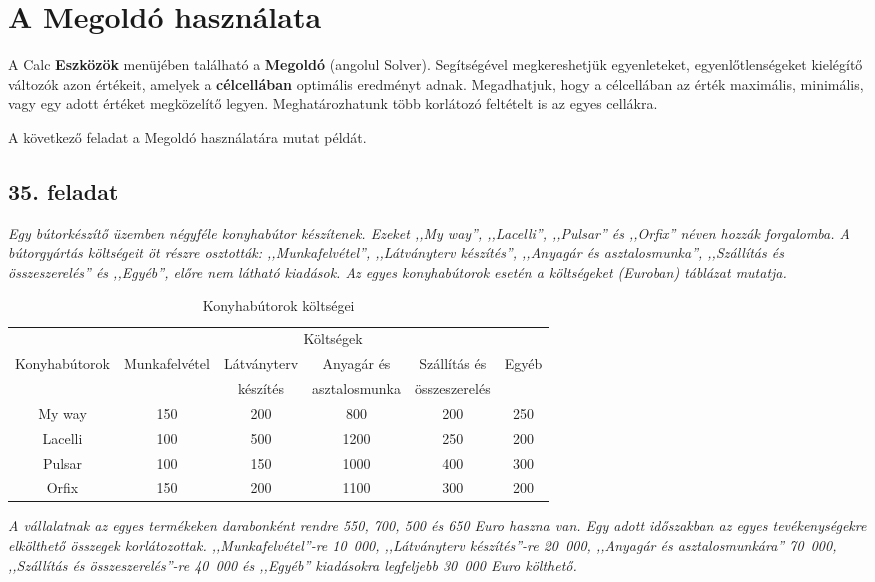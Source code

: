 \chapter{A Megoldó használata}
\thispagestyle{empty}

A Calc \textbf{Eszközök} menüjében található a
\textbf{Megoldó} (angolul Solver). Segítségével megkereshetjük egyenleteket, 
egyenlőtlenségeket kielégítő változók azon értékeit,
amelyek a \textbf{célcellában} optimális eredményt adnak. 
Megadhatjuk, hogy a célcellában az érték maximális, minimális, 
vagy egy adott értéket megközelítő legyen. Meghatározhatunk több
korlátozó feltételt is az egyes cellákra.

A következő feladat a Megoldó használatára mutat példát.


\section{35. feladat}

{\itshape
Egy bútorkészítő üzemben
négyféle konyhabútor készítenek. Ezeket ,,My way'', ,,Lacelli'',
,,Pulsar'' és ,,Orfix'' néven hozzák forgalomba. A
bútorgyártás költségeit öt részre osztották: ,,Munkafelvétel'',
,,Látványterv készítés'', ,,Anyagár és asztalosmunka'',
,,Szállítás és összeszerelés'' és ,,Egyéb'', előre nem látható
kiadások. Az egyes konyhabútorok esetén a költségeket
(Euroban)  táblázat mutatja.}

\begin{table}[!h]
\begin{center}
\caption{Konyhabútorok költségei}\label{Költségek}
\begin{tabular}{|c|c|c|c|c|c|}
\hline
 & \multicolumn{5}{c|}{Költségek}\\ \cline{2-6}
Konyhabútorok & Munkafelvétel & Látványterv & Anyagár és &
Szállítás és & Egyéb\\ 
 & & készítés & asztalosmunka & összeszerelés & \\ \hline
My way & 150 & 200 & 800 & 200 & 250\\ \hline
Lacelli & 100 & 500 & 1200 & 250 & 200\\ \hline
Pulsar & 100 & 150 & 1000 & 400 & 300\\ \hline
Orfix & 150 & 200 & 1100 & 300 & 200\\ \hline
\end{tabular}
\end{center}
\end{table}

{\itshape
A vállalatnak az egyes termékeken
darabonként rendre 550, 700, 500 és 650
Euro haszna van. Egy adott időszakban az
egyes tevékenységekre elkölthető összegek korlátozottak.
,,Munkafelvétel''-re 10~000, ,,Látványterv készítés''-re 20~000,
,,Anyagár és asztalosmunkára'' 70~000, ,,Szállítás és
összeszerelés''-re 40~000 és ,,Egyéb'' kiadásokra legfeljebb 30~000
Euro költhető. }

